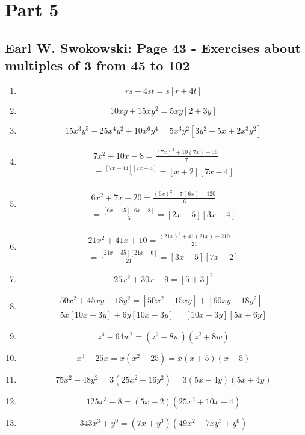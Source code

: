 \documentclass{article}
\begin{document}
\section{Part 5}
\subsection{Earl W. Swokowski: Page 43 - Exercises about multiples of 3 from 45 to 102}

\begin{enumerate}
	\item
	      \[ rs+4st=s[r+4t] \]
	\item
	      \[ 10xy+15xy^2=5xy[2+3y] \]
	\item
	      \[ 15x^3y^5-25x^4y^2+10x^6y^4=5x^3y^2[3y^2-5x+2x^3y^2] \]
	\item
	      \begin{align}
		      7x^2+10x-8=\frac{(7x)^2+10(7x)-56}{7} \\
		      =\frac{[7x+14][7x-4]}{7}=[x+2][7x-4]
	      \end{align}
	\item
	      \begin{align}
		      6x^2+7x-20=\frac{(6x)^2+7(6x)-120}{6} \\
		      =\frac{[6x+15][6x-8]}{6}=[2x+5][3x-4]
	      \end{align}
	\item
	      \begin{align}
		      21x^2+41x+10 = \frac{(21x)^2+41(21x)-210}{21} \\
		      =\frac{[21x+35][21x+6]}{21}=[3x+5][7x+2]
	      \end{align}
	\item
	      \[ 25x^2+30x+9 = [5+3]^2 \]
	\item
	      \begin{align}
		      50x^2 + 45xy - 18y^2 = [50x^2 - 15xy] + [60xy - 18y^2] \\
		      5x[10x - 3y] + 6y[10x - 3y] = [10x - 3y][5x + 6y]
	      \end{align}
	\item
	      \[ z^4 - 64w^2 = (z^2 - 8w)(z^2 + 8w) \]
	\item
	      \[ x^3 - 25x = x(x^2 - 25)=x(x + 5)(x - 5) \]
	\item
	      \[ 75x^2 - 48y^2=3(25x^2 - 16y^2)=3(5x - 4y)(5x + 4y) \]
	\item
	      \[ 125x^3 - 8=(5x - 2)(25x^2 + 10x + 4) \]
	\item
	      \[ 343x^3 + y^9=(7x + y^3)(49x^2 - 7xy^3 + y^6) \]

\end{enumerate}
\end{document}
